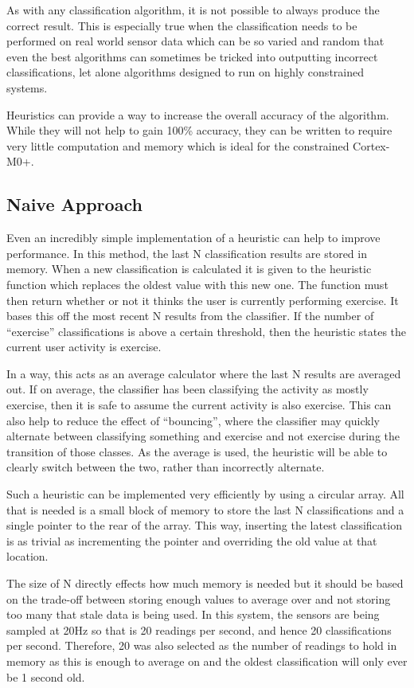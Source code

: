 As with any classification algorithm, it is not possible to always produce the correct result. This is especially true when the classification needs to be performed on real world sensor data which can be so varied and random that even the best algorithms can sometimes be tricked into outputting incorrect classifications, let alone algorithms designed to run on highly constrained systems.

Heuristics can provide a way to increase the overall accuracy of the algorithm. While they will not help to gain 100\% accuracy, they can be written to require very little computation and memory which is ideal for the constrained Cortex-M0+.

\subsection{Naive Approach}
Even an incredibly simple implementation of a heuristic can help to improve performance. In this method, the last N classification results are stored in memory. When a new classification is calculated it is given to the heuristic function which replaces the oldest value with this new one. The function must then return whether or not it thinks the user is currently performing exercise. It bases this off the most recent N results from the classifier. If the number of “exercise” classifications is above a certain threshold, then the heuristic states the current user activity is exercise. 

In a way, this acts as an average calculator where the last N results are averaged out. If on average, the classifier has been classifying the activity as mostly exercise, then it is safe to assume the current activity is also exercise. This can also help to reduce the effect of “bouncing”, where the classifier may quickly alternate between classifying something and exercise and not exercise during the transition of those classes. As the average is used, the heuristic will be able to clearly switch between the two, rather than incorrectly alternate.

Such a heuristic can be implemented very efficiently by using a circular array. All that is needed is a small block of memory to store the last N classifications and a single pointer to the rear of the array. This way, inserting the latest classification is as trivial as incrementing the pointer and overriding the old value at that location. 

The size of N directly effects how much memory is needed but it should be based on the trade-off between storing enough values to average over and not storing too many that stale data is being used. In this system, the sensors are being sampled at 20Hz so that is 20 readings per second, and hence 20 classifications per second. Therefore, 20 was also selected as the number of readings to hold in memory as this is enough to average on and the oldest classification will only ever be 1 second old.

